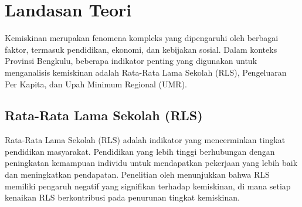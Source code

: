 \documentclass{article}
\begin{document}








\section{Landasan Teori}

Kemiskinan merupakan fenomena kompleks yang dipengaruhi oleh berbagai faktor, termasuk pendidikan, ekonomi, dan kebijakan sosial. Dalam konteks Provinsi Bengkulu, beberapa indikator penting yang digunakan untuk menganalisis kemiskinan adalah Rata-Rata Lama Sekolah (RLS), Pengeluaran Per Kapita, dan Upah Minimum Regional (UMR).

\subsection{Rata-Rata Lama Sekolah (RLS)}

Rata-Rata Lama Sekolah (RLS) adalah indikator yang mencerminkan tingkat pendidikan masyarakat. Pendidikan yang lebih tinggi berhubungan dengan peningkatan kemampuan individu untuk mendapatkan pekerjaan yang lebih baik dan meningkatkan pendapatan. Penelitian oleh \cite{pradipta2020pengaruh} menunjukkan bahwa RLS memiliki pengaruh negatif yang signifikan terhadap kemiskinan, di mana setiap kenaikan RLS berkontribusi pada penurunan tingkat kemiskinan.
\end{document}
